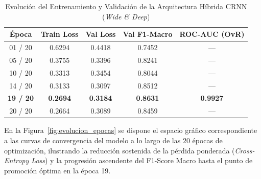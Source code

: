 \documentclass[11pt, a4paper]{article}
\begin{document}
\begin{table}[htbp]
\centering
\caption{Evolución del Entrenamiento y Validación de la Arquitectura Híbrida CRNN (\textit{Wide \& Deep})}
\label{tab:resultados_crnn}
\begin{tabular}{ccccc}
\toprule
\textbf{Época} & \textbf{Train Loss} & \textbf{Val Loss} & \textbf{Val F1-Macro} & \textbf{ROC-AUC (OvR)} \\
\midrule
01 / 20 & 0.6294 & 0.4418 & 0.7452 & --- \\
05 / 20 & 0.3755 & 0.3396 & 0.8241 & --- \\
10 / 20 & 0.3313 & 0.3454 & 0.8044 & --- \\
14 / 20 & 0.3133 & 0.3097 & 0.8512 & --- \\
\textbf{19 / 20} & \textbf{0.2694} & \textbf{0.3184} & \textbf{0.8631} & \textbf{0.9927} \\
20 / 20 & 0.2664 & 0.3089 & 0.8459 & --- \\
\bottomrule
\end{tabular}
\end{table}

En la Figura~\ref{fig:evolucion_epocas} se dispone el espacio gráfico correspondiente a las curvas de convergencia del modelo a lo largo de las $20$ épocas de optimización, ilustrando la reducción sostenida de la pérdida ponderada (\textit{Cross-Entropy Loss}) y la progresión ascendente del F1-Score Macro hasta el punto de promoción óptima en la época 19.
\end{document}
